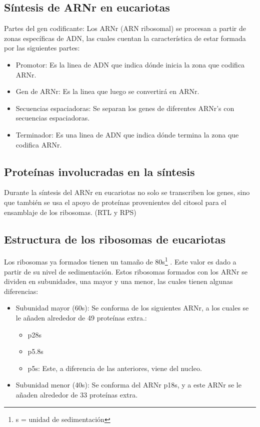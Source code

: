 \subsection{Síntesis de ARNr en eucariotas}

Partes del gen codificante: Los ARNr (ARN ribosomal) se procesan a partir de zonas específicas de ADN, las cuales cuentan la característica de estar formada por las siguientes partes:

\begin{itemize}
    \item Promotor: Es la linea de ADN que indica dónde inicia la zona que codifica ARNr.
    \item Gen de ARNr: Es la linea que luego se convertirá en ARNr.
    \item Secuencias espaciadoras: Se separan los genes de diferentes ARNr's con secuencias espaciadoras.
    \item Terminador: Es una linea de ADN que indica dónde termina la zona que codifica ARNr.
\end{itemize}

\subsection{Proteínas involucradas en la síntesis}

Durante la síntesis del ARNr en eucariotas no solo se transcriben los genes, sino que también se usa el apoyo de proteínas provenientes del citosol para el ensamblaje de los ribosomas. (RTL y RPS)

\subsection{Estructura de los ribosomas de eucariotas}

Los ribosomas ya formados tienen un tamaño de 80s\footnote{s = unidad de sedimentación} . Este valor es dado a partir de su nivel de sedimentación.
Estos ribosomas formados con los ARNr se dividen en subunidades, una mayor y una menor, las cuales tienen algunas diferencias:

\begin{itemize}
    \item Subunidad mayor (60s): Se conforma de los siguientes ARNr, a los cuales se le añaden alrededor de 49 proteínas extra.:
        \begin{itemize}
            \item p28s
            \item p5.8s
            \item p5s: Este, a diferencia de las anteriores, viene del nucleo. 
        \end{itemize} 
        
    \item Subunidad menor (40s): Se conforma del ARNr p18s, y a este ARNr se le añaden alrededor de 33 proteínas extra.
\end{itemize}

